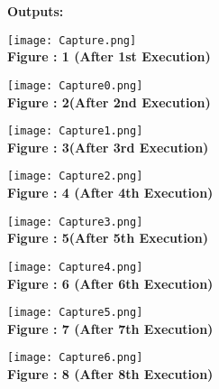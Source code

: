 \documentclass[11pt]{article}            %
\begin{document}
\textbf{Outputs: }\\ 

\begin{center}
 \texttt{[image: Capture.png]}\\ 
\textbf{Figure : 1 (After 1st Execution)}
\vskip 0.5cm
\end{center}

\begin{center}
 \texttt{[image: Capture0.png]}\\ 
\textbf{Figure : 2(After 2nd Execution)}
\vskip 0.5cm
\end{center}

\begin{center}
 \texttt{[image: Capture1.png]}\\ 
\textbf{Figure : 3(After 3rd Execution)}
\vskip 0.5cm
\end{center}

\begin{center}
 \texttt{[image: Capture2.png]}\\ 
\textbf{Figure : 4 (After 4th Execution)}
\vskip 0.5cm
\end{center}

\begin{center}
 \texttt{[image: Capture3.png]}\\ 
\textbf{Figure : 5(After 5th Execution)}
\vskip 0.5cm
\end{center}

\begin{center}
 \texttt{[image: Capture4.png]}\\ 
\textbf{Figure : 6 (After 6th Execution)}
\vskip 0.5cm
\end{center}

\begin{center}
 \texttt{[image: Capture5.png]}\\ 
\textbf{Figure : 7 (After 7th Execution)}
\vskip 0.5cm
\end{center}

 \begin{center}
 \texttt{[image: Capture6.png]}\\ 
\textbf{Figure : 8 (After 8th Execution)}
\vskip 0.5cm
\end{center}
\end{document}

